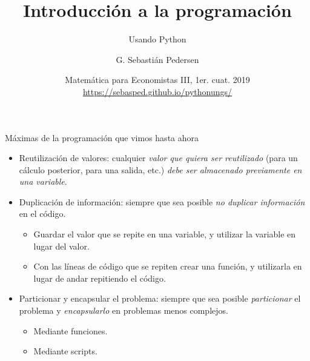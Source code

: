 \documentclass{beamer}
\title[Intro Prog] %
{Introducción a la programación}
\subtitle
{Usando Python}
\author[SP]
{G. Sebastián Pedersen}%
\institute[UNGS] %
{
  Instituto de Industria\\
  Universidad Nacional de General Sarmiento
}
\date[] %
{Matemática para Economistas III, 1er. cuat. 2019\\ 
\vspace{.5cm}
\url{https://sebasped.github.io/pythonungs/}
}
\begin{document}
\begin{frame}
  \titlepage
\end{frame}



\begin{frame}{Máximas de la programación que vimos hasta ahora}
\begin{itemize}
	\item \alert{Reutilización de valores:} \pause cualquier \emph{valor que quiera ser reutilizado} (para un cálculo posterior, para una salida, etc.) \emph{debe ser almacenado previamente en una variable}.\pause
	\item \alert{Duplicación de información:} \pause siempre que sea posible \emph{no duplicar información} en el código.\pause
		\begin{itemize}
			\item Guardar el valor que se repite en una variable, y utilizar la variable en lugar del valor.\pause
			\item Con las líneas de código que se repiten crear una función, y utilizarla en lugar de andar repitiendo el código.
		\end{itemize}\pause
	\item \alert{Particionar y encapsular el problema:} siempre que sea posible \emph{particionar} el problema y \emph{encapsularlo} en problemas menos complejos.\pause
		\begin{itemize}
			\item Mediante funciones.\pause
			\item Mediante scripts.
		\end{itemize}
\end{itemize}
\end{frame}
\end{document}
